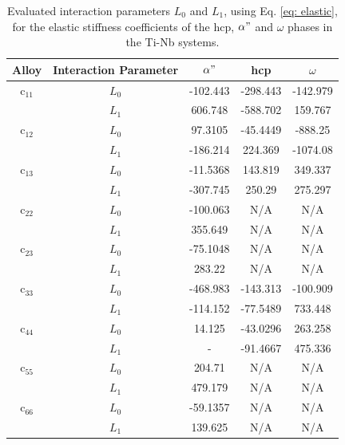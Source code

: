 \newpage
\begin{table}[H]
	\caption{Evaluated interaction parameters $L_0$ and $L_1$, using Eq. \ref{eq: elastic}, for the elastic stiffness coefficients of the hcp, $\alpha"$ and $\omega$ phases in the Ti-Nb systems.}
	\centering
	\begin{tabular}{ c c c c c }
		\hline
		Alloy & Interaction Parameter & $\alpha"$ & hcp & $\omega$\\
		\hline
		c$_{11}$ & $L_{0}$ & -102.443 & -298.443 & -142.979 \\
		& $L_{1}$ & 606.748 & -588.702 & 159.767 \\
		c$_{12}$ & $L_{0}$ & 97.3105 & -45.4449 & -888.25 \\
		& $L_{1}$ & -186.214 & 224.369 & -1074.08 \\
		c$_{13}$ & $L_{0}$ & -11.5368 & 143.819 & 349.337 \\
		& $L_{1}$ & -307.745 & 250.29 & 275.297 \\
		c$_{22}$ & $L_{0}$ & -100.063 & N/A & N/A \\
		& $L_{1}$ & 355.649 & N/A & N/A \\
		c$_{23}$ & $L_{0}$ & -75.1048 & N/A & N/A \\
		& $L_{1}$ & 283.22 & N/A & N/A \\
		c$_{33}$ & $L_{0}$ & -468.983 & -143.313 & -100.909 \\
		& $L_{1}$ & -114.152 & -77.5489 & 733.448 \\
		c$_{44}$ & $L_{0}$ & 14.125 & -43.0296 & 263.258 \\
		& $L_{1}$ & - & -91.4667 & 475.336 \\
		c$_{55}$ & $L_{0}$ & 204.71 & N/A & N/A \\
		& $L_{1}$ & 479.179 & N/A & N/A \\
		c$_{66}$ & $L_{0}$ & -59.1357 & N/A & N/A \\
		& $L_{1}$ & 139.625 & N/A & N/A \\
		\hline
	\end{tabular}
	\label{Ch7-table:intpara}
\end{table}
\clearpage

